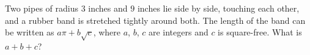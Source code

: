 Two pipes of radius $3$ inches and $9$ inches lie side by side, touching each other, and a rubber band is stretched tightly around both. The length of the band can be written as $a\pi+b\sqrt c$, where $a$, $b$, $c$ are integers and $c$ is square-free. What is $a+b+c$?
